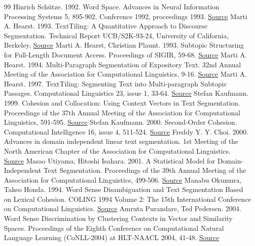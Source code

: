 \documentclass[10pt,letterpaper]{article}
\begin{document}
\begin{thebibliography}{99}
Hinrich Schütze. 1992. Word Space. Advances in Neural Information Processing Systems 5, 895-902. Conference 1992, proceedings 1993. \href{https://papers.neurips.cc/paper/1992/hash/d86ea612dec96096c5e0fcc8dd42ab6d-Abstract.html}{Source}
Marti A. Hearst. 1993. TextTiling: A Quantitative Approach to Discourse Segmentation. Technical Report UCB/S2K-93-24, University of California, Berkeley. \href{https://people.ischool.berkeley.edu/~hearst/research/tiling.html}{Source}
Marti A. Hearst, Christian Plaunt. 1993. Subtopic Structuring for Full-Length Document Access. Proceedings of SIGIR, 59-68. \href{https://doi.org/10.1145/160688.160695}{Source}
Marti A. Hearst. 1994. Multi-Paragraph Segmentation of Expository Text. 32nd Annual Meeting of the Association for Computational Linguistics, 9-16. \href{https://aclanthology.org/P94-1002/}{Source}
Marti A. Hearst. 1997. TextTiling: Segmenting Text into Multi-paragraph Subtopic Passages. Computational Linguistics 23, issue 1, 33-64. \href{https://aclanthology.org/J97-1003/}{Source}
Stefan Kaufmann. 1999. Cohesion and Collocation: Using Context Vectors in Text Segmentation. Proceedings of the 37th Annual Meeting of the Association for Computational Linguistics, 591-595. \href{https://aclanthology.org/P99-1077/}{Source}
Stefan Kaufmann. 2000. Second‐Order Cohesion. Computational Intelligence 16, issue 4, 511-524. \href{https://doi.org/10.1111/0824-7935.00124}{Source}
Freddy Y. Y. Choi. 2000. Advances in domain independent linear text segmentation. 1st Meeting of the North American Chapter of the Association for Computational Linguistics. \href{https://aclanthology.org/A00-2004/}{Source}
Masao Utiyama, Hitoshi Isahara. 2001. A Statistical Model for Domain-Independent Text Segmentation. Proceedings of the 39th Annual Meeting of the Association for Computational Linguistics, 499-506. \href{https://aclanthology.org/P01-1064/}{Source}
Manabu Okumura, Takeo Honda. 1994. Word Sense Disambiguation and Text Segmentation Based on Lexical Cohesion. COLING 1994 Volume 2: The 15th International Conference on Computational Linguistics. \href{https://aclanthology.org/C94-2121/}{Source}
Amruta Purandare, Ted Pedersen. 2004. Word Sense Discrimination by Clustering Contexts in Vector and Similarity Spaces. Proceedings of the Eighth Conference on Computational Natural Language Learning (CoNLL-2004) at HLT-NAACL 2004, 41-48. \href{https://aclanthology.org/W04-2406/}{Source}

\end{thebibliography}
\end{document}
